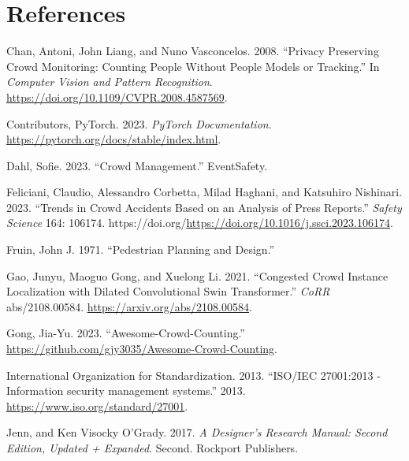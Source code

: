 \documentclass[
]{article}
\newlength{\cslhangindent}
\newlength{\cslentryspacingunit} %
\newenvironment{CSLReferences}[2] %
 {%
  \setlength{\parindent}{0pt}
  \ifodd #1
  \let\oldpar\par
  \def\par{\hangindent=\cslhangindent\oldpar}
  \fi
  \setlength{\parskip}{#2\cslentryspacingunit}
 }%
 {}
\begin{document}
\newpage{}

\hypertarget{references}{%
\section*{References}\label{references}}

\hypertarget{refs}{}
\begin{CSLReferences}{1}{0}
\leavevmode{}%
Chan, Antoni, John Liang, and Nuno Vasconcelos. 2008. {``Privacy
Preserving Crowd Monitoring: Counting People Without People Models or
Tracking.''} In \emph{Computer Vision and Pattern Recognition}.
\url{https://doi.org/10.1109/CVPR.2008.4587569}.

\leavevmode{}%
Contributors, PyTorch. 2023. \emph{PyTorch Documentation}.
\url{https://pytorch.org/docs/stable/index.html}.

\leavevmode{}%
Dahl, Sofie. 2023. {``Crowd Management.''} EventSafety.

\leavevmode{}%
Feliciani, Claudio, Alessandro Corbetta, Milad Haghani, and Katsuhiro
Nishinari. 2023. {``Trends in Crowd Accidents Based on an Analysis of
Press Reports.''} \emph{Safety Science} 164: 106174.
https://doi.org/\url{https://doi.org/10.1016/j.ssci.2023.106174}.

\leavevmode{}%
Fruin, John J. 1971. {``Pedestrian Planning and Design.''}

\leavevmode{}%
Gao, Junyu, Maoguo Gong, and Xuelong Li. 2021. {``Congested Crowd
Instance Localization with Dilated Convolutional Swin Transformer.''}
\emph{CoRR} abs/2108.00584. \url{https://arxiv.org/abs/2108.00584}.

\leavevmode{}%
Gong, Jia-Yu. 2023. {``Awesome-Crowd-Counting.''}
\url{https://github.com/gjy3035/Awesome-Crowd-Counting}.

\leavevmode{}%
International Organization for Standardization. 2013. {``{ISO/IEC
27001:2013 - Information security management systems}.''} 2013.
\url{https://www.iso.org/standard/27001}.

\leavevmode{}%
Jenn, and Ken Visocky O'Grady. 2017. \emph{A Designer's Research Manual:
Second Edition, Updated + Expanded}. Second. Rockport Publishers.


\end{CSLReferences}
\end{document}
